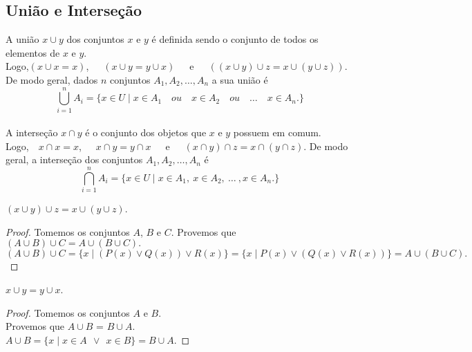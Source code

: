    \subsection{União e Interseção}
      A união $x \cup y$ dos conjuntos $x$ e $y$ é definida sendo o conjunto de todos os elementos de $x$ e $y$.\\
      Logo,\quad $(x \cup x = x)$,\ \ \ $(x \cup y = y \cup x)$\ \ \ e\ \ \ $((x \cup y) \cup z = x \cup (y \cup z))$.
      De modo geral, dados $n$ conjuntos $A_{1}, A_{2}, \dots, A_{n}$ a sua união é
      \[
         \bigcup_{i=1}^{n} A_{i} = \{x \in U \mid x \in A_{1}\quad ou\quad x \in A_{2}\quad ou\quad \dots \quad x \in A_{n}.\}
      \]
      \\
      A interseção $x \cap y$ é o conjunto dos objetos que $x$ e $y$ possuem em comum.\\
      Logo,\ \ $x \cap x = x$,\ \ \ $x \cap y = y \cap x$\ \ \ e\ \ \ $(x \cap y) \cap z = x \cap (y \cap z)$.
      De modo geral, a interseção dos conjuntos $A_{1}, A_{2}, \dots, A_{n}$ é
      \[
         \bigcap_{i=1}^{n} A_{i} = \{x \in U \mid x \in A_{1},\ x \in A_{2},\  \dots\ , x \in A_{n}.\}
      \]
      \begin{stat}
         $(x \cup y) \cup z = x \cup (y \cup z)$.
         \begin{proof}
            Tomemos os conjuntos $A$, $B$ e $C$.
            Provemos que $(A \cup B) \cup C = A \cup (B \cup C).$
            $(A \cup B) \cup C = \{x \mid (P(x) \lor Q(x)) \lor R(x) \} = \{x \mid P(x) \lor (Q(x) \lor R(x)) \} = A \cup (B \cup C).$
         \end{proof}
      \end{stat}
      \begin{stat}
         $x \cup y = y \cup x$.
         \begin{proof}
            Tomemos os conjuntos $A$ e $B.$\\
            Provemos que $A \cup B$ = $B \cup A.$\\
            $A \cup B = \{x \mid x \in A\ \ \lor\ \ x \in B \} = B \cup A.$
         \end{proof}
      \end{stat}
